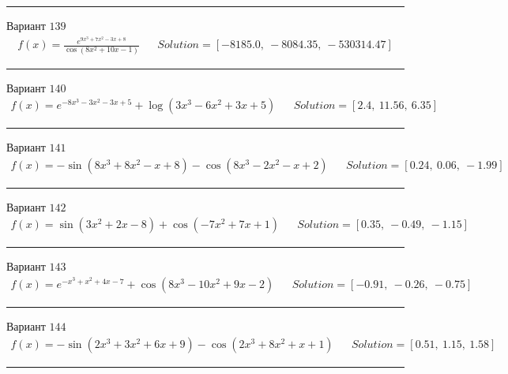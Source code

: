 \documentclass[11pt]{report}
\begin{document}
\begin{center}
    \noindent\rule{8cm}{0.4pt}
\end{center}
Вариант \(139\)
\begin{align*}
    f(x) = \frac{e^{9 x^{3} + 7 x^{2} - 3 x + 8}}{\cos{\left(8 x^{2} + 10 x - 1 \right)}} && Solution = \left[ -8185.0, \  -8084.35, \  -530314.47\right]
\end{align*}
\begin{center}
    \noindent\rule{8cm}{0.4pt}
\end{center}
Вариант \(140\)
\begin{align*}
    f(x) = e^{- 8 x^{3} - 3 x^{2} - 3 x + 5} + \log{\left(3 x^{3} - 6 x^{2} + 3 x + 5 \right)} && Solution = \left[ 2.4, \  11.56, \  6.35\right]
\end{align*}
\begin{center}
    \noindent\rule{8cm}{0.4pt}
\end{center}
Вариант \(141\)
\begin{align*}
    f(x) = - \sin{\left(8 x^{3} + 8 x^{2} - x + 8 \right)} - \cos{\left(8 x^{3} - 2 x^{2} - x + 2 \right)} && Solution = \left[ 0.24, \  0.06, \  -1.99\right]
\end{align*}
\begin{center}
    \noindent\rule{8cm}{0.4pt}
\end{center}
Вариант \(142\)
\begin{align*}
    f(x) = \sin{\left(3 x^{2} + 2 x - 8 \right)} + \cos{\left(- 7 x^{2} + 7 x + 1 \right)} && Solution = \left[ 0.35, \  -0.49, \  -1.15\right]
\end{align*}
\begin{center}
    \noindent\rule{8cm}{0.4pt}
\end{center}
Вариант \(143\)
\begin{align*}
    f(x) = e^{- x^{3} + x^{2} + 4 x - 7} + \cos{\left(8 x^{3} - 10 x^{2} + 9 x - 2 \right)} && Solution = \left[ -0.91, \  -0.26, \  -0.75\right]
\end{align*}
\begin{center}
    \noindent\rule{8cm}{0.4pt}
\end{center}
Вариант \(144\)
\begin{align*}
    f(x) = - \sin{\left(2 x^{3} + 3 x^{2} + 6 x + 9 \right)} - \cos{\left(2 x^{3} + 8 x^{2} + x + 1 \right)} && Solution = \left[ 0.51, \  1.15, \  1.58\right]
\end{align*}
\begin{center}
    \noindent\rule{8cm}{0.4pt}
\end{center}
\end{document}
